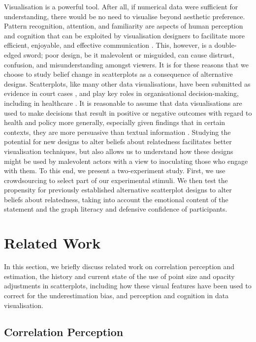 \documentclass[sigconf]{acmart}
\begin{document}
Visualisation is a powerful tool. After all, if numerical data were
sufficient for understanding, there would be no need to visualise beyond
aesthetic preference. Pattern recognition, attention, and familiarity
are aspects of human perception and cognition that can be exploited by
visualisation designers to facilitate more efficient, enjoyable, and
effective communication \citep{franconeri_2021}. This, however, is a
double-edged sword; poor design, be it malevolent or misguided, can
cause distrust, confusion, and misunderstanding amongst viewers. It is
for these reasons that we choose to study belief change in scatterplots
as a consequence of alternative designs. Scatterplots, like many other
data visualisations, have been submitted as evidence in court cases
\citep{bobko_1979}, and play key roles in organisational
decision-making, including in healthcare \citep{poly_2019}. It is
reasonable to assume that data visualisations are used to make decisions
that result in positive or negative outcomes with regard to health and
policy more generally, especially given findings that in certain
contexts, they are more persuasive than textual information
\citep{pandey_2014}. Studying the potential for new designs to alter
beliefs about relatedness facilitates better visualisation techniques,
but also allows us to understand how these designs might be used by
malevolent actors with a view to inoculating those who engage with them.
To this end, we present a two-experiment study. First, we use
crowdsourcing to select part of our experimental stimuli. We then test
the propensity for previously established alternative scatterplot
designs to alter beliefs about relatedness, taking into account the
emotional content of the statement and the graph literacy and defensive
confidence of participants.

\section{Related Work}\label{sec-rel-work-main}

In this section, we briefly discuss related work on correlation
perception and estimation, the history and current state of the use of
point size and opacity adjustments in scatterplots, including how these
visual features have been used to correct for the underestimation bias,
and perception and cognition in data visualisation.

\subsection{Correlation Perception}\label{sec-corr-percept}
\end{document}
